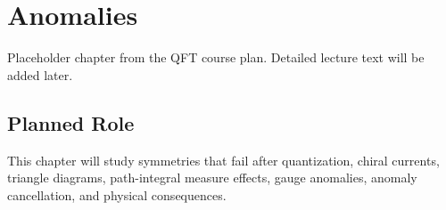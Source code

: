 \chapter{Anomalies}

\begin{remarkbox}
Placeholder chapter from the QFT course plan. Detailed lecture text will be added later.
\end{remarkbox}

\section{Planned Role}

This chapter will study symmetries that fail after quantization, chiral currents, triangle diagrams, path-integral measure effects, gauge anomalies, anomaly cancellation, and physical consequences.
